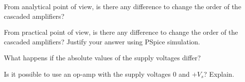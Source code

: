 \documentclass[11pt]{article}
\begin{document}


\begin{question}


    \begin{subquestion}{From analytical point of view, is there any difference to change the order of the cascaded amplifiers?}
        \answer{}
    \end{subquestion}

    \begin{subquestion}{From practical point of view, is there any difference to change the order of the cascaded amplifiers? Justify your answer using PSpice simulation.}
        \answer{}
    \end{subquestion}

\end{question}


\begin{question}


    \begin{subquestion}{What happens if the absolute values of the supply voltages differ? }
        \answer{}
    \end{subquestion}

    \begin{subquestion}{Is it possible to use an op-amp with the supply voltages $0$ and $+V_s$? Explain.}
        \answer{}
    \end{subquestion}

\end{question}



\begin{question}


\end{question}

\end{document}
